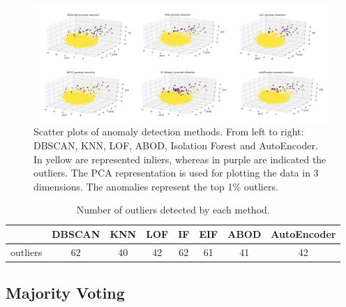 \begin{figure}[!htb]
  \centering
  \includegraphics[width=1\linewidth]{images/anomaly-detection_scatters.png}
  \caption{Scatter plots of anomaly detection methods. From left to right: DBSCAN, KNN, LOF, ABOD, Isolation Forest and AutoEncoder. In yellow are represented inliers, whereas in purple are indicated the outliers. The PCA representation is used for plotting the data in 3 dimensions. The anomalies represent the top 1\% outliers.}
\end{figure}


\begin{table}[!htb]
\centering
\begin{tabular}{llllllll}
\hline
                             & DBSCAN                 & KNN                    & LOF                    & IF                     & EIF                    & ABOD                   & AutoEncoder            \\ \hline
\multicolumn{1}{c}{outliers} & \multicolumn{1}{c}{62} & \multicolumn{1}{c}{40} & \multicolumn{1}{c}{42} & \multicolumn{1}{c}{62} & \multicolumn{1}{c}{61} & \multicolumn{1}{c}{41} & \multicolumn{1}{c}{42} \\ \hline
\end{tabular}
\caption{Number of outliers detected by each method.}
\label{Number of outliers detected by each method}
\end{table}


\subsection{Majority Voting}

